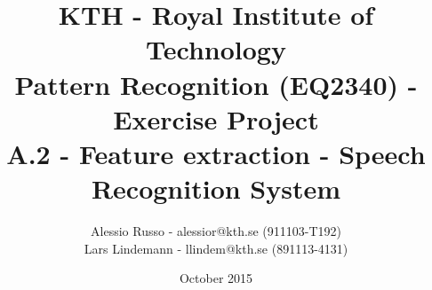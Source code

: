 \documentclass[10pt,a4paper,final]{article}
\author{Alessio Russo - alessior@kth.se (911103-T192) \\ Lars Lindemann - llindem@kth.se (891113-4131)}
\title{KTH - Royal Institute of Technology \\ \Large{Pattern Recognition (EQ2340) - Exercise Project }\\ A.2 - Feature extraction - Speech Recognition System}
\date{October 2015}
\begin{document}
\maketitle
\tableofcontents

\clearpage

\pagebreak 
\pagebreak 
\pagebreak 
\pagebreak 
 \pagebreak

\end{document}
